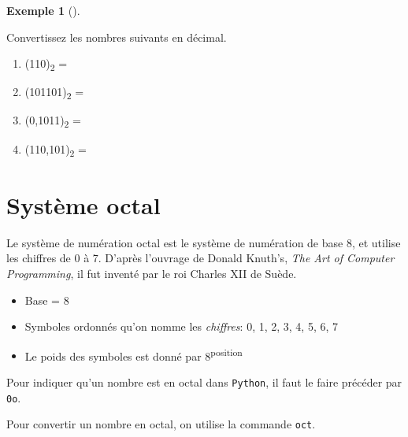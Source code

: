 \documentclass[
  letterpaper,
]{scrbook}
\providecommand{\tightlist}{%
  \setlength{\itemsep}{0pt}\setlength{\parskip}{0pt}}\usepackage{longtable,booktabs,array}
\theoremstyle{plain}
\theoremstyle{definition}
\theoremstyle{definition}
\newtheorem{example}{Exemple}[chapter]
\theoremstyle{remark}
\begin{document}
\begin{example}[]\protect\hypertarget{exm-binaire-to-decimal}{}\label{exm-binaire-to-decimal}

Convertissez les nombres suivants en décimal.

\begin{enumerate}
\def\labelenumi{(\alph{enumi})}
\tightlist
\item
  (110)\textsubscript{2} =
\item
  (101101)\textsubscript{2} =
\item
  (0,1011)\textsubscript{2} =
\item
  (110,101)\textsubscript{2} =
\end{enumerate}

\end{example}

\hypertarget{systuxe8me-octal}{%
\section{Système octal}\label{systuxe8me-octal}}

Le système de numération octal est le système de numération de base 8,
et utilise les chiffres de 0 à 7. D'après l'ouvrage de Donald Knuth's,
\emph{The Art of Computer Programming}, il fut inventé par le roi
Charles XII de Suède.

\begin{itemize}
\tightlist
\item
  Base = 8
\item
  Symboles ordonnés qu'on nomme les \emph{chiffres}: 0, 1, 2, 3, 4, 5,
  6, 7
\item
  Le poids des symboles est donné par 8\textsuperscript{position}
\end{itemize}

\begin{tcolorbox}[enhanced jigsaw, colbacktitle=quarto-callout-tip-color!10!white, toptitle=1mm, left=2mm, toprule=.15mm, opacityback=0, bottomrule=.15mm, breakable, coltitle=black, title=\textcolor{quarto-callout-tip-color}{\faLightbulb}\hspace{0.5em}{Nombres octaux en \texttt{Python}}, colframe=quarto-callout-tip-color-frame, arc=.35mm, titlerule=0mm, rightrule=.15mm, opacitybacktitle=0.6, leftrule=.75mm, bottomtitle=1mm, colback=white]

Pour indiquer qu'un nombre est en octal dans \texttt{Python}, il faut le
faire précéder par \texttt{0o}.

Pour convertir un nombre en octal, on utilise la commande \texttt{oct}.

\end{tcolorbox}
\end{document}
